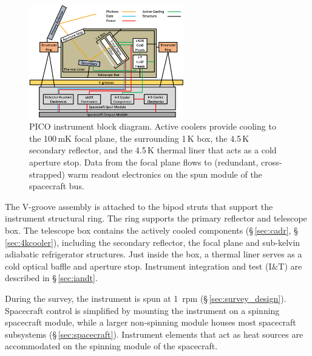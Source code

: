 \begin{figure}
\vskip -8pt
\hfill
\includegraphics[width=0.6\textwidth]{images/ArchitectureBlockDiagram.png} 
\vskip -2pt
\caption{\captiontext
PICO instrument block diagram. Active coolers provide cooling to the 100\,mK focal plane, the surrounding 1\,K box, the 4.5\,K secondary reflector, and the 4.5\,K thermal liner that acts as a cold aperture stop. Data from the focal plane flows to (redundant, cross-strapped) warm readout electronics on the spun module of the spacecraft bus.
\label{fig:ArchitectureBlockDiagram} }  
\end{figure}

The V-groove assembly is attached to the bipod struts that support the instrument structural ring. The ring supports the primary reflector and telescope box. The telescope box contains the actively cooled components (\S\,\ref{sec:cadr}, \S\,\ref{sec:4kcooler}), including the secondary reflector, the focal plane and sub-kelvin adiabatic refrigerator structures. Just inside the box, a thermal liner serves as a cold optical baffle and aperture stop. Instrument integration and test (I\&T) are described in \S\,\ref{sec:iandt}.

During the survey, the instrument is spun at 1~rpm (\S\,\ref{sec:survey_design}). Spacecraft control is simplified by mounting the instrument on a spinning spacecraft module, while a larger non-spinning module houses most spacecraft subsystems (\S\,\ref{sec:spacecraft}). Instrument elements that act as heat sources are accommodated on the spinning module of the spacecraft.

